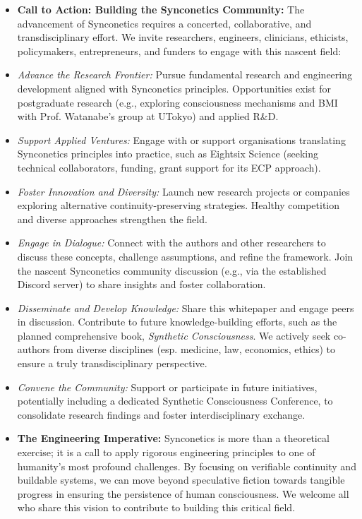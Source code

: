 \documentclass[10pt]{article}
\begin{document}
\begin{sloppypar}
\begin{itemize}
    \item \textbf{Call to Action: Building the Synconetics Community:} The advancement of Synconetics requires a concerted, collaborative, and transdisciplinary effort. We invite researchers, engineers, clinicians, ethicists, policymakers, entrepreneurs, and funders to engage with this nascent field:
    \item \textit{Advance the Research Frontier:} Pursue fundamental research and engineering development aligned with Synconetics principles. Opportunities exist for postgraduate research (e.g., exploring consciousness mechanisms and BMI with Prof. Watanabe's group at UTokyo) and applied R\&D.
    \item \textit{Support Applied Ventures:} Engage with or support organisations translating Synconetics principles into practice, such as Eightsix Science (seeking technical collaborators, funding, grant support for its ECP approach).
    \item \textit{Foster Innovation and Diversity:} Launch new research projects or companies exploring alternative continuity-preserving strategies. Healthy competition and diverse approaches strengthen the field.
    \item \textit{Engage in Dialogue:} Connect with the authors and other researchers to discuss these concepts, challenge assumptions, and refine the framework. Join the nascent Synconetics community discussion (e.g., via the established Discord server) to share insights and foster collaboration.
    \item \textit{Disseminate and Develop Knowledge:} Share this whitepaper and engage peers in discussion. Contribute to future knowledge-building efforts, such as the planned comprehensive book, \textit{Synthetic Consciousness}. We actively seek co-authors from diverse disciplines (esp. medicine, law, economics, ethics) to ensure a truly transdisciplinary perspective.
    \item \textit{Convene the Community:} Support or participate in future initiatives, potentially including a dedicated Synthetic Consciousness Conference, to consolidate research findings and foster interdisciplinary exchange.

    \item \textbf{The Engineering Imperative:} Synconetics is more than a theoretical exercise; it is a call to apply rigorous engineering principles to one of humanity's most profound challenges. By focusing on verifiable continuity and buildable systems, we can move beyond speculative fiction towards tangible progress in ensuring the persistence of human consciousness. We welcome all who share this vision to contribute to building this critical field.

  \end{itemize}


  \pagebreak
  
  
  \nocite{*}

\end{sloppypar}
\end{document}
